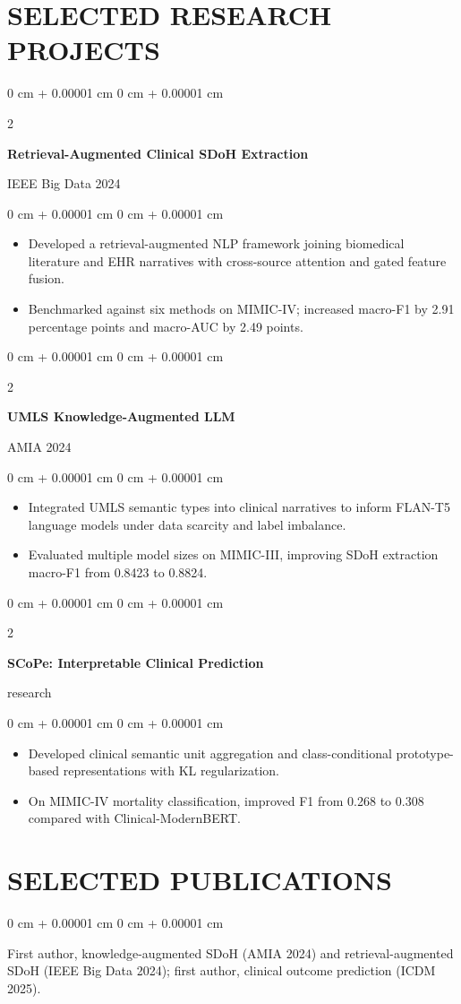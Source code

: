 \documentclass[10pt, letterpaper]{article}
\newenvironment{highlights}{
    \begin{itemize}[
        topsep=0.10 cm,
        parsep=0.10 cm,
        partopsep=0pt,
        itemsep=0pt,
        leftmargin=0 cm + 10pt
    ]
}{
    \end{itemize}
} %
\newenvironment{onecolentry}{
    \begin{adjustwidth}{
        0 cm + 0.00001 cm
    }{
        0 cm + 0.00001 cm
    }
}{
    \end{adjustwidth}
} %
\newenvironment{twocolentry}[2][]{
    \onecolentry
    \def\secondColumn{#2}
    \setcolumnwidth{\fill, 4.5 cm}
    \begin{paracol}{2}
}{
    \switchcolumn \raggedleft \secondColumn
    \end{paracol}
    \endonecolentry
} %
\begin{document}
\section{SELECTED RESEARCH PROJECTS}
\begin{twocolentry}{IEEE Big Data 2024}
\textbf{Retrieval-Augmented Clinical SDoH Extraction}
\end{twocolentry}
\begin{onecolentry}
\begin{highlights}
\item Developed a retrieval-augmented NLP framework joining biomedical literature and EHR narratives with cross-source attention and gated feature fusion.
\item Benchmarked against six methods on MIMIC-IV; increased macro-F1 by 2.91 percentage points and macro-AUC by 2.49 points.
\end{highlights}
\end{onecolentry}
\vspace{0.02 cm}
\begin{twocolentry}{AMIA 2024}
\textbf{UMLS Knowledge-Augmented LLM}
\end{twocolentry}
\begin{onecolentry}
\begin{highlights}
\item Integrated UMLS semantic types into clinical narratives to inform FLAN-T5 language models under data scarcity and label imbalance.
\item Evaluated multiple model sizes on MIMIC-III, improving SDoH extraction macro-F1 from 0.8423 to 0.8824.
\end{highlights}
\end{onecolentry}
\vspace{0.02 cm}
\begin{twocolentry}{2026 research}
\textbf{SCoPe: Interpretable Clinical Prediction}
\end{twocolentry}
\begin{onecolentry}
\begin{highlights}
\item Developed clinical semantic unit aggregation and class-conditional prototype-based representations with KL regularization.
\item On MIMIC-IV mortality classification, improved F1 from 0.268 to 0.308 compared with Clinical-ModernBERT.
\end{highlights}
\end{onecolentry}
\vspace{0.02 cm}
\section{SELECTED PUBLICATIONS}
\begin{onecolentry}
First author, knowledge-augmented SDoH (AMIA 2024) and retrieval-augmented SDoH (IEEE Big Data 2024); first author, clinical outcome prediction (ICDM 2025).
\end{onecolentry}
\end{document}
